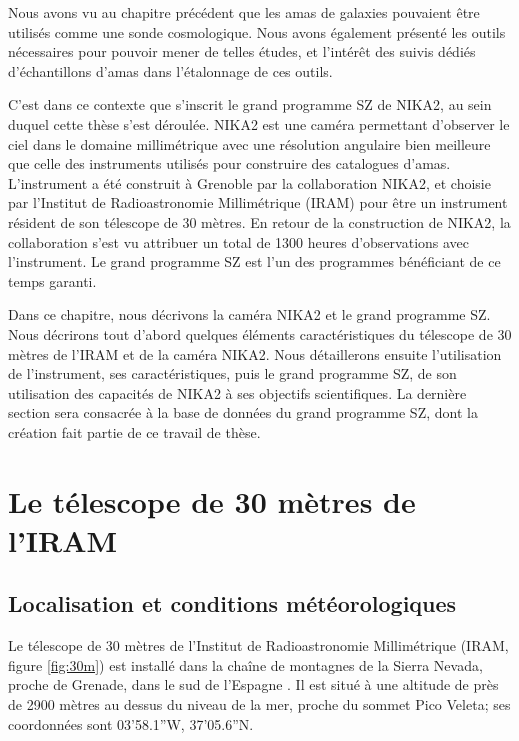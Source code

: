 Nous avons vu au chapitre précédent que les amas de galaxies pouvaient être utilisés comme une sonde cosmologique.
Nous avons également présenté les outils nécessaires pour pouvoir mener de telles études, et l'intérêt des suivis dédiés d'échantillons d'amas dans l'étalonnage de ces outils.

C'est dans ce contexte que s'inscrit le grand programme SZ de NIKA2, au sein duquel cette thèse s'est déroulée.
NIKA2 est une caméra permettant d'observer le ciel dans le domaine millimétrique avec une résolution angulaire bien meilleure que celle des instruments utilisés pour construire des catalogues d'amas.
L'instrument a été construit à Grenoble par la collaboration NIKA2, et choisie par l'Institut de Radioastronomie Millimétrique (IRAM) pour être un instrument résident de son télescope de 30 mètres.
En retour de la construction de NIKA2, la collaboration s'est vu attribuer un total de 1300 heures d'observations avec l'instrument.
Le grand programme SZ est l'un des programmes bénéficiant de ce temps garanti.

Dans ce chapitre, nous décrivons la caméra NIKA2 et le grand programme SZ.
Nous décrirons tout d'abord quelques éléments caractéristiques du télescope de 30 mètres de l'IRAM et de la caméra NIKA2.
Nous détaillerons ensuite l'utilisation de l'instrument, ses caractéristiques, puis le grand programme SZ, de son utilisation des capacités de NIKA2 à ses objectifs scientifiques.
La dernière section sera consacrée à la base de données du grand programme SZ, dont la création fait partie de ce travail de thèse.

\section{Le télescope de 30 mètres de l'IRAM}\label{sec:30m}

\subsection{Localisation et conditions météorologiques}\label{sec:30m_geo}

Le télescope de 30 mètres de l'Institut de Radioastronomie Millimétrique (IRAM, figure \ref{fig:30m}) est installé dans la chaîne de montagnes de la Sierra Nevada, proche de Grenade, dans le sud de l'Espagne \cite{baars_iram_1987}.
Il est situé à une altitude de près de 2900 mètres au dessus du niveau de la mer, proche du sommet Pico Veleta; ses coordonnées sont 03'58.1''W, 37'05.6''N.

